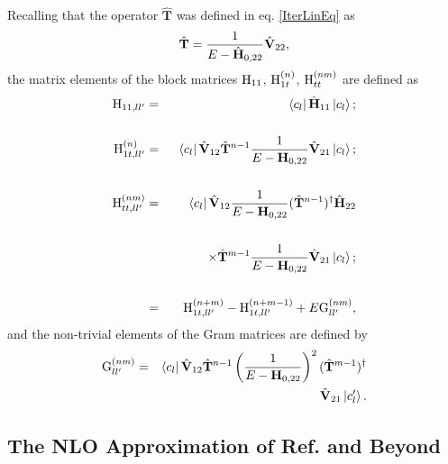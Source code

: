 \documentclass[twocolumn,secnumarabic,amssymb, nobibnotes, aps, prd]{revtex4-2}
\newcommand{\be}{\begin{equation}}
\newcommand{\ee}{\end{equation}}
\newcommand{\Ht}{{\hat {\bf T}}}
\newcommand{\Hll}{\hat{\bf H}_{11}}
\newcommand{\Hhh}{\hat{\bf H}_{22}}
\newcommand{\Vhh}{\hat{\bf V}_{22}}
\newcommand{\Vhl}{\hat{\bf V}_{21}}
\newcommand{\Vlh}{\hat{\bf V}_{12}}
\begin{document}
Recalling that the operator $\hat{\mathbf{T}}$ was defined in eq. \eqref{IterLinEq} as
\be
\hat{\mathbf{T}}=\frac{1}{E-\hat {\bf H}_{0,22}}\Vhh,
\ee
the matrix elements of the block matrices ${\rm H}_{11}$, ${\rm H}_{1t}^{(n)}$, ${\rm H}_{tt}^{(nm)}$ are defined as
\begin{eqnarray}
{\rm H}_{11,ll'} &=& \bra{c_l}\Hll \ket{c_l};\cr\cr
{\rm H}^{(n)}_{1t,ll'} &=& \bra{c_l}\Vlh \Ht^{n-1}\frac{1}{E-{\bf H}_{0,22}}\Vhl\ket{c_l};\cr\cr
{\rm H}^{(nm)}_{tt,ll'} &=& \bra{c_l}\Vlh \frac{1}{E-{\bf H}_{0,22}}(\Ht^{n-1})^\dagger \Hhh\cr\cr
&& \hskip .4in \times \Ht^{m-1} \frac{1}{E-{\bf H}_{0,22}}\Vhl\ket{c_l};\cr\cr
&=& {\rm H}^{(n+m)}_{1t,ll'} - {\rm H}^{(n+m-1)}_{1t,ll'} + E \G{nm}_{ll'},
\label{GenHtails}\end{eqnarray}
and the non-trivial elements of the Gram matrices are defined by 
\begin{eqnarray}
\G{nm}_{ll'} &=& \bra{c_l}\Vlh \Ht^{n-1} \left(\frac{1}{E-{\bf H}_{0,22}}\right)^2(\Ht^{m-1})^\dagger \nonumber\\
&&\Vhl\ket{c_l'}.
\end{eqnarray}


\subsection{The NLO Approximation of Ref. \cite{Elias-Miro:2017tup} and Beyond}
\end{document}

